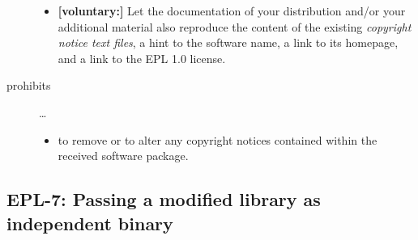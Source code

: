 \begin{description}
\begin{itemize}
  \item \textbf{[voluntary:]} Let the documentation of your distribution and/or
  your additional material  also reproduce the content of the existing
  \emph{copyright notice text files}, a hint to the software name, a link to its
  homepage, and a link to the EPL 1.0 license.

\end{itemize}

\item[prohibits] \ldots
\begin{itemize}
  \item to remove or to alter any copyright notices contained within the
  received software package.
\end{itemize}

\end{description}


\subsection{EPL-7: Passing a modified library as independent binary}
\label{OSUC-08B-EPL}

